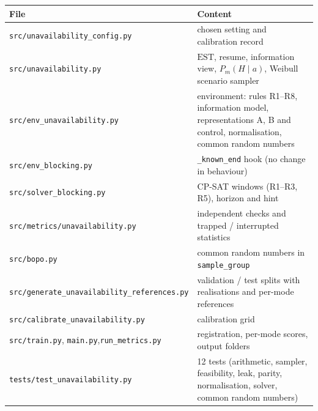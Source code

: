 \documentclass[11pt,a4paper]{article}
\newcommand{\EST}{\mathrm{EST}}
\newcommand{\code}[1]{\texttt{#1}}
\begin{document}
\begin{center}
\small
\begin{tabularx}{\textwidth}{@{}>{\raggedright\arraybackslash}p{} X@{}}
\toprule
File & Content \\
\midrule
\code{src/unavailability\_config.py} & chosen setting and calibration record \\
\code{src/unavailability.py} & $\EST$, resume, information view, $P_m(H\mid a)$, Weibull scenario sampler \\
\code{src/env\_unavailability.py} & environment: rules R1--R8, information model, representations A, B and control, normalisation, common random numbers \\
\code{src/env\_blocking.py} & \code{\_known\_end} hook (no change in behaviour) \\
\code{src/solver\_blocking.py} & CP-SAT windows (R1--R3, R5), horizon and hint \\
\code{src/metrics/unavailability.py} & independent checks and trapped / interrupted statistics \\
\code{src/bopo.py} & common random numbers in \code{sample\_group} \\
\code{src/generate\_unavailability\_}\newline\code{references.py} & validation / test splits with realisations and per-mode references \\
\code{src/calibrate\_unavailability.py} & calibration grid \\
\code{src/train.py}, \code{main.py},\newline\code{run\_metrics.py} & registration, per-mode scores, output folders \\
\code{tests/test\_}\newline\code{unavailability.py} & 12 tests (arithmetic, sampler, feasibility, leak, parity, normalisation, solver, common random numbers) \\
\bottomrule
\end{tabularx}
\end{center}
\end{document}
